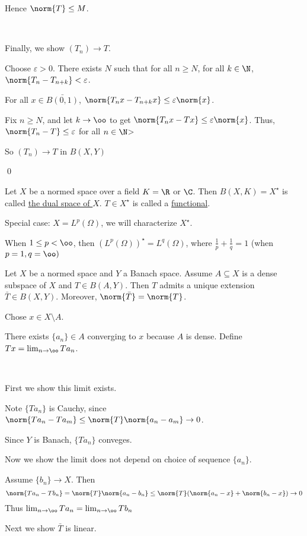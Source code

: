\documentclass[x11names,reqno,14pt]{extarticle}
\begin{document}
Hence $\norm{T}\leq M$. 

\,

Finally, we show $(T_n)\to T$. 

Choose $\varepsilon>0$. There exists $N$ such that for all $n \geq N$, for all $k \in \N$, $\norm{T_n - T_{n + k}}<\varepsilon$. 

For all $x \in \bar{B(0, 1)}$, $\norm{T_nx - T_{n + k}x} \leq \varepsilon\norm{x}$. 

Fix $n \geq N$, and let $k\to\oo$ to get $\norm{T_nx - Tx} \leq \varepsilon\norm{x}$. Thus, $\norm{T_n - T} \leq \varepsilon$ for all $n \in \N$> 

So $(T_n) \to T$ in $B(X, Y)$

\qed


Let $X$ be a normed space over a field $K = \R$ or $\C$. Then $B(X, K) = X^\star$ is called \underline{the dual space of $X$}. $T \in X^\star$ is called a \underline{functional}.

Special case: $X = L^p(\Omega)$, we will characterize $X^\star$. 

When $1 \leq p < \oo$, then $(L^p(\Omega))^\star = L^q(\Omega)$, where $\frac{1}{p} + \frac{1}{q} = 1$ (when $p = 1, q = \oo)$

\thm

Let $X$ be a normed space and $Y$ a Banach space. Assume $A \subseteq X$ is a dense subspace of $X$ and $T\in B(A, Y)$. Then $T$ admits a unique extension $\bar{T}\in B(X, Y).$ Moreover, $\norm{\bar{T}} = \norm{T}$. 

\proof

Chose $x \in X\setminus A$. 

There exists $\{a_n\} \in A$ converging to $x$ because $A$ is dense. Define $Tx = \lim_{n\to\oo}Ta_n$. 

\,

First we show this limit exists. 

Note $\{Ta_n\}$ is Cauchy, since $\norm{Ta_n - Ta_m} \leq \norm{T}\norm{a_n - a_m} \to 0$. 

Since $Y$ is Banach, $\{Ta_n\}$ conveges. 

Now we show the limit does not depend on choice of sequence $\{a_n\}$. 

Assume $\{b_n\}\to X$. Then
\[
\norm{Ta_n - Tb_n} = \norm{T} \norm{a_n - b_n} \leq \norm{T}(\norm{a_n - x} + \norm{b_n - x}) \to 0
\]
Thus $\lim_{n\to\oo}Ta_n = \lim_{n\to\oo}Tb_n$

Next we show $\bar{T}$ is linear.
\end{document}
